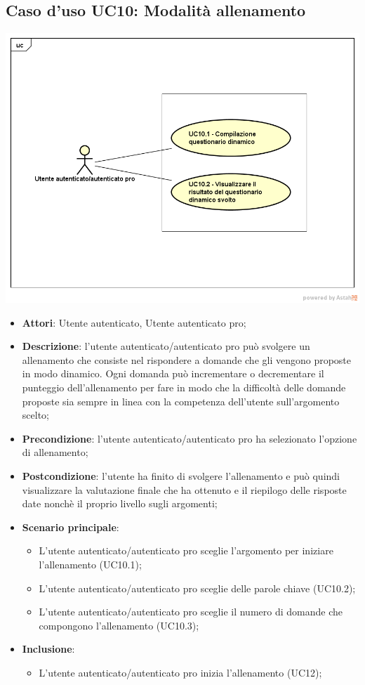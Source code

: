\subsection{Caso d'uso UC10: Modalità allenamento}
\begin{center}
\includegraphics[scale=0.5]{UML/UC10.png}
\end{center}
\begin{itemize}
\item\textbf{Attori}: Utente autenticato, Utente autenticato pro;
\item\textbf{Descrizione}: l'utente autenticato/autenticato pro può svolgere un allenamento che consiste nel rispondere a domande che gli vengono proposte in modo dinamico. Ogni domanda può incrementare o decrementare il punteggio dell'allenamento per fare in modo che la difficoltà delle domande proposte sia sempre in linea con la competenza dell'utente sull'argomento scelto;
\item\textbf{Precondizione}: l'utente autenticato/autenticato pro ha selezionato l'opzione di allenamento;
\item\textbf{Postcondizione}: l'utente ha finito di svolgere l'allenamento e può quindi visualizzare la valutazione finale che ha ottenuto e il riepilogo delle risposte date nonchè il proprio livello sugli argomenti;
\item\textbf{Scenario principale}:
	\begin{itemize}
		\item L'utente autenticato/autenticato pro sceglie l'argomento per iniziare l'allenamento (UC10.1);
		\item L'utente autenticato/autenticato pro sceglie delle parole chiave (UC10.2);
		\item L'utente autenticato/autenticato pro sceglie il numero di domande che compongono l'allenamento (UC10.3);
	\end{itemize}
\item \textbf{Inclusione}:
	\begin{itemize}
		\item L'utente autenticato/autenticato pro inizia l'allenamento (UC12);
	\end{itemize}
\end{itemize}

